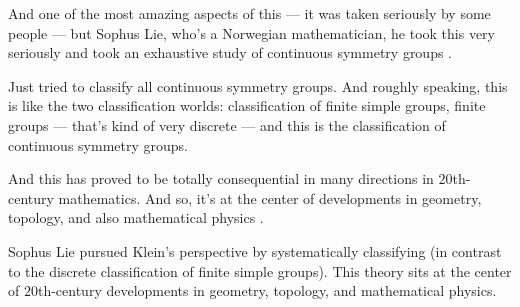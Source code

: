 \begin{speech}[00:37:16 - 00:38:18]
And one of the most amazing aspects of this --- it was taken seriously by some people --- but Sophus Lie, who's a Norwegian mathematician, he took this very seriously and took an exhaustive study of continuous symmetry groups .

Just tried to classify all continuous symmetry groups. And roughly speaking, this is like the two classification worlds: classification of finite simple groups, finite groups --- that's kind of very discrete --- and this is the classification of continuous symmetry groups.

And this has proved to be totally consequential in many directions in $20$th-century mathematics. And so, it's at the center of developments in geometry, topology, and also mathematical physics .
\end{speech}

\begin{content}
Sophus Lie pursued Klein's perspective by systematically classifying  (in contrast to the discrete classification of finite simple groups). This theory sits at the center of $20$th-century developments in geometry, topology, and mathematical physics.
\end{content}

